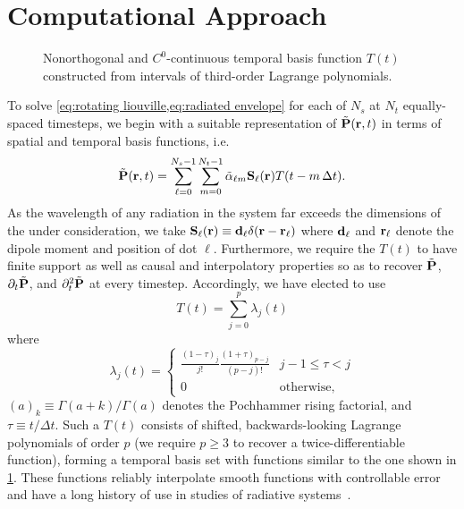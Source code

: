 \section{\label{section:computational approach}Computational Approach}

\begin{figure}
  
  \caption{\label{fig:interpolation basis} Nonorthogonal and $C^0$-continuous temporal basis function $T(t)$ constructed from intervals of third-order Lagrange polynomials.}
\end{figure}
To solve \cref{eq:rotating liouville,eq:radiated envelope} for each of $N_s$ \qds{} at $N_t$ equally-spaced timesteps, we begin with a suitable representation of $\tilde{\vb{P}}(\vb{r}, t)$ in terms of spatial and temporal basis functions, i.e.~
\begin{equation}
  \tilde{\vb{P}}(\vb{r}, t) = \sum_{\ell=0}^{N_s - 1} \sum_{m = 0}^{N_t - 1} \tilde{\alpha}_{\ell m} \vb{S}_\ell(\vb{r}) T(t - m \, \Delta t).
  \label{eq:basis function representation}
\end{equation}
As the wavelength of any radiation in the system far exceeds the dimensions of the \qds{} under consideration, we take $\vb{S}_\ell(\vb{r}) \equiv \vb{d}_\ell \delta(\vb{r} - \vb{r}_\ell)$ where $\vb{d}_\ell$ and $\vb{r}_\ell$ denote the dipole moment and position of dot $\ell$.
Furthermore, we require the $T(t)$ to have finite support as well as causal and interpolatory properties so as to recover $\tilde{\vb{P}}$, $\partial_t \tilde{\vb{P}}$, and $\partial^2_t \tilde{\vb{P}}$ at every timestep.
Accordingly, we have elected to use
\begin{equation}
  T(t) = \sum_{j = 0}^p \lambda_j(t)
  \label{eq:basis sum}
\end{equation}
where
\begin{equation}
  \lambda_j(t) =
  \begin{cases}
    \frac{(1 - \tau)_j}{j!} \frac{(1 + \tau)_{p-j}}{(p-j)!} & j-1 \le \tau < j \\
    0 & \text{otherwise,}
  \end{cases}
  \label{eq:basis piece}
\end{equation}
$(a)_k \equiv \Gamma(a + k)/\Gamma(a)$ denotes the Pochhammer rising factorial, and $\tau \equiv t/\Delta t$.
Such a $T(t)$ consists of shifted, backwards-looking Lagrange polynomials of order $p$ (we require $p \ge 3$ to recover a twice-differentiable function), forming a temporal basis set with functions similar to the one shown in \cref{fig:interpolation basis}.
These functions  reliably interpolate smooth functions with controllable error and have a long history of use in studies of radiative systems~\cite{Manara1997,Bluck1997}.

